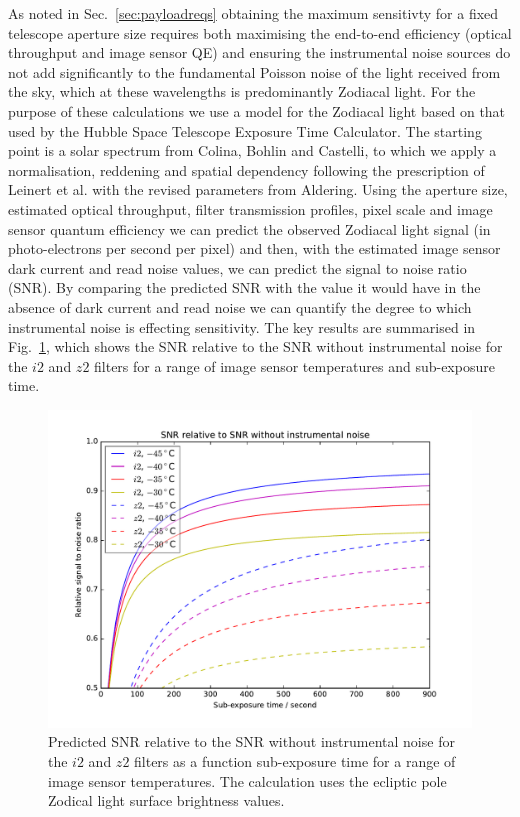 \documentclass[]{iac}
\begin{document}
As noted in Sec.~\ref{sec:payloadreqs} obtaining the maximum sensitivty for a fixed telescope aperture size requires
both maximising the end-to-end efficiency (optical throughput and image sensor QE) and ensuring the instrumental noise
sources do not add significantly to the fundamental Poisson noise of the light received from the sky, which at these
wavelengths is predominantly Zodiacal light. For the purpose of these calculations we use a model for the Zodiacal light
based on that used by the Hubble Space Telescope Exposure Time Calculator\cite{Giavalisco2002}. The starting point is a
solar spectrum from Colina, Bohlin and Castelli\cite{Colina1996}, to which we apply a normalisation, reddening and
spatial dependency following the prescription of Leinert et al.\cite{Leinert1998} with the revised parameters from
Aldering\cite{Aldering2001}. Using the aperture size, estimated optical throughput, filter transmission profiles, pixel
scale and image sensor quantum efficiency we can predict the observed Zodiacal light signal (in photo-electrons per
second per pixel) and then, with the estimated image sensor dark current and read noise values, we can predict the
signal to noise ratio (SNR). By comparing the predicted SNR with the value it would have in the absence of dark current
and read noise we can quantify the degree to which instrumental noise is effecting sensitivity. The key results are
summarised in Fig.~\ref{fig:relsnr}, which shows the SNR relative to the SNR without instrumental noise for the $i2$ and
$z2$ filters for a range of image sensor temperatures and sub-exposure time.

\begin{figure}[tbp]
  \center \includegraphics[width=\columnwidth]{figures/relsnr.pdf}
  \caption{\label{fig:relsnr}Predicted SNR relative to the SNR without instrumental noise for the $i2$ and $z2$ filters
    as a function sub-exposure time for a range of image sensor temperatures. The calculation uses the ecliptic pole
    Zodical light surface brightness values.}
\end{figure}
\end{document}
